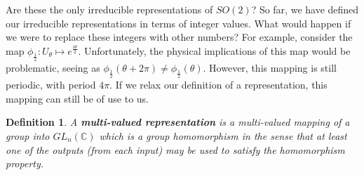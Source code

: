 \documentclass[10pt]{ucthesis}
\newcommand{\Z}{\mathbb{Z}}
\newcommand{\C}{\mathbb{C}}
\newtheorem{definition}{Definition}[chapter]
\newtheorem{theorem}[definition]{Theorem}
\begin{document}



Are these the only irreducible representations of $SO(2)$? So far, we have defined our irreducible representations in terms of integer values. What would happen if we were to replace these integers with other numbers? For example, consider the map $\phi_{\frac{1}{2}}: U_\theta \mapsto e^\frac{i\theta}{2}$. Unfortunately, the physical implications of this map would be problematic, seeing as $\phi_\frac{1}{2}(\theta + 2\pi) \neq  \phi_\frac{1}{2}(\theta)$. However, this mapping is still periodic, with period $4\pi$. If we relax our definition of a representation, this mapping can still be of use to us.

\begin{definition}
	A \textbf{multi-valued representation} is a multi-valued mapping of a group into $GL_n(\C)$ which is a group homomorphism in the sense that at least one of the outputs (from each input) may be used to satisfy the homomorphism property.
\end{definition}
\end{document}
